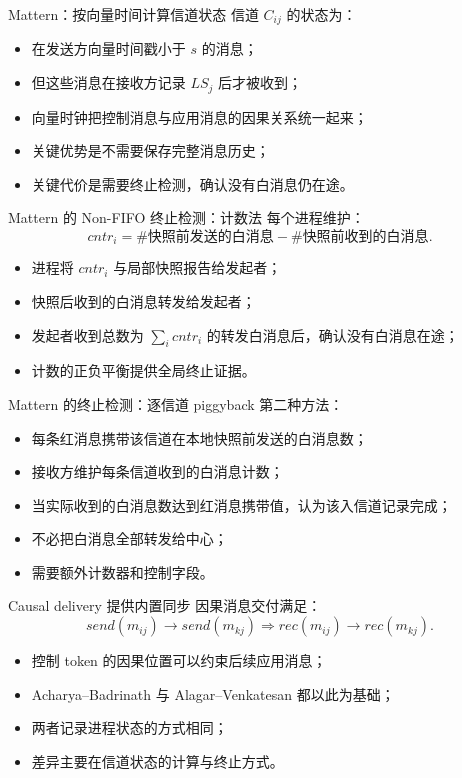 \documentclass[UTF8,fontset=none,aspectratio=169,10pt]{beamer}
\begin{document}
\begin{frame}{Mattern：按向量时间计算信道状态}
信道 $C_{ij}$ 的状态为：
\begin{itemize}
  \item 在发送方向量时间戳小于 $s$ 的消息；
  \item 但这些消息在接收方记录 $LS_j$ 后才被收到；
  \item 向量时钟把控制消息与应用消息的因果关系统一起来；
  \item 关键优势是不需要保存完整消息历史；
  \item 关键代价是需要终止检测，确认没有白消息仍在途。
\end{itemize}
\end{frame}

\begin{frame}{Mattern 的 Non-FIFO 终止检测：计数法}
每个进程维护：
\[
cntr_i=\#\text{快照前发送的白消息}-\#\text{快照前收到的白消息}.
\]
\begin{itemize}
  \item 进程将 $cntr_i$ 与局部快照报告给发起者；
  \item 快照后收到的白消息转发给发起者；
  \item 发起者收到总数为 $\sum_i cntr_i$ 的转发白消息后，确认没有白消息在途；
  \item 计数的正负平衡提供全局终止证据。
\end{itemize}
\end{frame}

\begin{frame}{Mattern 的终止检测：逐信道 piggyback}
第二种方法：
\begin{itemize}
  \item 每条红消息携带该信道在本地快照前发送的白消息数；
  \item 接收方维护每条信道收到的白消息计数；
  \item 当实际收到的白消息数达到红消息携带值，认为该入信道记录完成；
  \item 不必把白消息全部转发给中心；
  \item 需要额外计数器和控制字段。
\end{itemize}
\end{frame}


\begin{frame}{Causal delivery 提供内置同步}
因果消息交付满足：
\[
send(m_{ij})\rightarrow send(m_{kj})
\Rightarrow
rec(m_{ij})\rightarrow rec(m_{kj}).
\]
\begin{itemize}
  \item 控制 token 的因果位置可以约束后续应用消息；
  \item Acharya--Badrinath 与 Alagar--Venkatesan 都以此为基础；
  \item 两者记录进程状态的方式相同；
  \item 差异主要在信道状态的计算与终止方式。
\end{itemize}
\end{frame}
\end{document}
